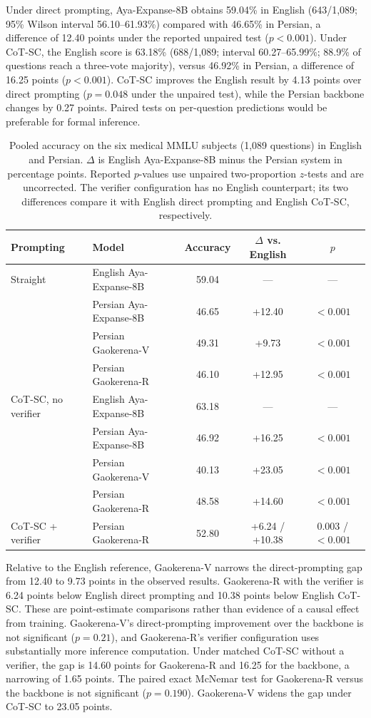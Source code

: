 \documentclass[manuscript,screen,review]{acmart}
\begin{document}
Under direct prompting, Aya-Expanse-8B obtains 59.04\% in English (643/1,089; 95\% Wilson interval 56.10--61.93\%) compared with 46.65\% in Persian, a difference of 12.40 points under the reported unpaired test ($p<0.001$). Under CoT-SC, the English score is 63.18\% (688/1,089; interval 60.27--65.99\%; 88.9\% of questions reach a three-vote majority), versus 46.92\% in Persian, a difference of 16.25 points ($p<0.001$). CoT-SC improves the English result by 4.13 points over direct prompting ($p=0.048$ under the unpaired test), while the Persian backbone changes by 0.27 points. Paired tests on per-question predictions would be preferable for formal inference.

\begin{table}[ht]
\caption{Pooled accuracy on the six medical MMLU subjects (1,089 questions) in English and Persian. $\Delta$ is English Aya-Expanse-8B minus the Persian system in percentage points. Reported $p$-values use unpaired two-proportion $z$-tests and are uncorrected. The verifier configuration has no English counterpart; its two differences compare it with English direct prompting and English CoT-SC, respectively.}\label{tab:en_fa}
\small
\setlength{\tabcolsep}{4pt}
\begin{tabular}{@{}llccc@{}}
\toprule
Prompting & Model & Accuracy & $\Delta$ vs. English & $p$ \\
\midrule
Straight & English Aya-Expanse-8B & 59.04 & --- & --- \\
 & Persian Aya-Expanse-8B & 46.65 & +12.40 & $<0.001$ \\
 & Persian Gaokerena-V & 49.31 & +9.73 & $<0.001$ \\
 & Persian Gaokerena-R & 46.10 & +12.95 & $<0.001$ \\
\midrule
CoT-SC, no verifier & English Aya-Expanse-8B & 63.18 & --- & --- \\
 & Persian Aya-Expanse-8B & 46.92 & +16.25 & $<0.001$ \\
 & Persian Gaokerena-V & 40.13 & +23.05 & $<0.001$ \\
 & Persian Gaokerena-R & 48.58 & +14.60 & $<0.001$ \\
\midrule
CoT-SC + verifier & Persian Gaokerena-R & 52.80 & +6.24 / +10.38 & 0.003 / $<0.001$ \\
\bottomrule
\end{tabular}
\end{table}

Relative to the English reference, Gaokerena-V narrows the direct-prompting gap from 12.40 to 9.73 points in the observed results. Gaokerena-R with the verifier is 6.24 points below English direct prompting and 10.38 points below English CoT-SC. These are point-estimate comparisons rather than evidence of a causal effect from training. Gaokerena-V's direct-prompting improvement over the backbone is not significant ($p=0.21$), and Gaokerena-R's verifier configuration uses substantially more inference computation. Under matched CoT-SC without a verifier, the gap is 14.60 points for Gaokerena-R and 16.25 for the backbone, a narrowing of 1.65 points. The paired exact McNemar test for Gaokerena-R versus the backbone is not significant ($p=0.190$). Gaokerena-V widens the gap under CoT-SC to 23.05 points.
\end{document}
